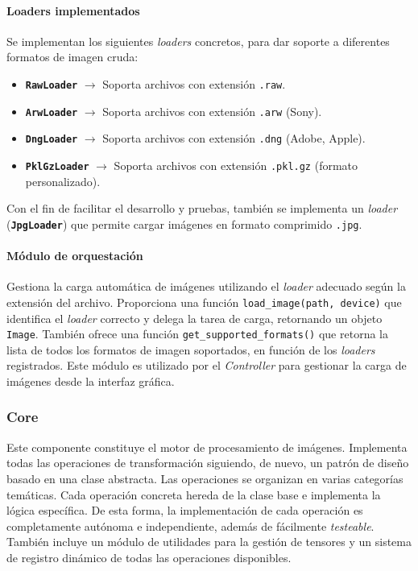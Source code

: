\paragraph{Loaders implementados} \label{par:7_3_2_2_loaders}
Se implementan los siguientes \textit{loaders} concretos, para dar soporte a diferentes formatos de imagen cruda: \footnotemark

\begin{itemize}[noitemsep]
    \item \texttt{\textbf{RawLoader}} $\rightarrow$ Soporta archivos con extensión \texttt{.raw}.
    \item \texttt{\textbf{ArwLoader}} $\rightarrow$ Soporta archivos con extensión \texttt{.arw} (Sony).
    \item \texttt{\textbf{DngLoader}} $\rightarrow$ Soporta archivos con extensión \texttt{.dng} (Adobe, Apple).
    \item \texttt{\textbf{PklGzLoader}} $\rightarrow$ Soporta archivos con extensión \texttt{.pkl.gz} 
    (formato personalizado).
\end{itemize}

Con el fin de facilitar el desarrollo y pruebas, también se implementa un \textit{loader} (\texttt{\textbf{JpgLoader}})
que permite cargar imágenes en formato comprimido \texttt{.jpg}. 

\paragraph{Módulo de orquestación} \label{par:7_3_2_3_modulo_orquestacion}
Gestiona la carga automática de imágenes utilizando el \textit{loader} adecuado según la extensión del archivo. 
Proporciona una función \texttt{load\_image(path, device)} que identifica el \textit{loader} correcto
y delega la tarea de carga, retornando un objeto \texttt{Image}. También ofrece una función
\texttt{get\_supported\_formats()} que retorna la lista de todos los formatos de imagen soportados, 
en función de los \textit{loaders} registrados. Este módulo es utilizado por el \textit{Controller} para gestionar 
la carga de imágenes desde la interfaz gráfica.


\newpage

\subsubsection{Core} \label{subsubsec:7_3_3_core}
Este componente constituye el motor de procesamiento de imágenes. Implementa todas las operaciones de transformación 
siguiendo, de nuevo, un patrón de diseño basado en una clase abstracta. Las operaciones se organizan en varias 
categorías temáticas. Cada operación concreta hereda de la clase base e implementa la lógica específica. 
De esta forma, la implementación de cada operación es completamente autónoma e independiente, además de fácilmente 
\textit{testeable}. También incluye un módulo de utilidades para la gestión de tensores y un sistema de registro 
dinámico de todas las operaciones disponibles.

